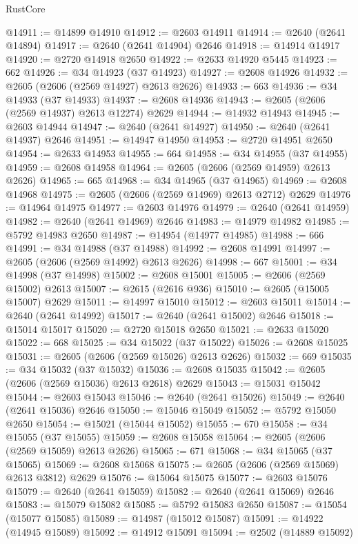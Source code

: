 \begin{lexlean}{RustCore}
\begin{coremodule}
@14911 := @14899 @14910
@14912 := @2603 @14911
@14914 := @2640 (@2641 @14894)
@14917 := @2640 (@2641 @14904) @2646
@14918 := @14914 @14917
@14920 := @2720 @14918 @2650
@14922 := @2633 @14920 @5445
@14923 := 662
@14926 := @34 @14923 (@37 @14923)
@14927 := @2608 @14926
@14932 := @2605 (@2606 (@2569 @14927) @2613 @2626)
@14933 := 663
@14936 := @34 @14933 (@37 @14933)
@14937 := @2608 @14936
@14943 := @2605 (@2606 (@2569 @14937) @2613 @12274) @2629
@14944 := @14932 @14943
@14945 := @2603 @14944
@14947 := @2640 (@2641 @14927)
@14950 := @2640 (@2641 @14937) @2646
@14951 := @14947 @14950
@14953 := @2720 @14951 @2650
@14954 := @2633 @14953
@14955 := 664
@14958 := @34 @14955 (@37 @14955)
@14959 := @2608 @14958
@14964 := @2605 (@2606 (@2569 @14959) @2613 @2626)
@14965 := 665
@14968 := @34 @14965 (@37 @14965)
@14969 := @2608 @14968
@14975 := @2605 (@2606 (@2569 @14969) @2613 @2712) @2629
@14976 := @14964 @14975
@14977 := @2603 @14976
@14979 := @2640 (@2641 @14959)
@14982 := @2640 (@2641 @14969) @2646
@14983 := @14979 @14982
@14985 := @5792 @14983 @2650
@14987 := @14954 (@14977 @14985)
@14988 := 666
@14991 := @34 @14988 (@37 @14988)
@14992 := @2608 @14991
@14997 := @2605 (@2606 (@2569 @14992) @2613 @2626)
@14998 := 667
@15001 := @34 @14998 (@37 @14998)
@15002 := @2608 @15001
@15005 := @2606 (@2569 @15002) @2613
@15007 := @2615 (@2616 @936)
@15010 := @2605 (@15005 @15007) @2629
@15011 := @14997 @15010
@15012 := @2603 @15011
@15014 := @2640 (@2641 @14992)
@15017 := @2640 (@2641 @15002) @2646
@15018 := @15014 @15017
@15020 := @2720 @15018 @2650
@15021 := @2633 @15020
@15022 := 668
@15025 := @34 @15022 (@37 @15022)
@15026 := @2608 @15025
@15031 := @2605 (@2606 (@2569 @15026) @2613 @2626)
@15032 := 669
@15035 := @34 @15032 (@37 @15032)
@15036 := @2608 @15035
@15042 := @2605 (@2606 (@2569 @15036) @2613 @2618) @2629
@15043 := @15031 @15042
@15044 := @2603 @15043
@15046 := @2640 (@2641 @15026)
@15049 := @2640 (@2641 @15036) @2646
@15050 := @15046 @15049
@15052 := @5792 @15050 @2650
@15054 := @15021 (@15044 @15052)
@15055 := 670
@15058 := @34 @15055 (@37 @15055)
@15059 := @2608 @15058
@15064 := @2605 (@2606 (@2569 @15059) @2613 @2626)
@15065 := 671
@15068 := @34 @15065 (@37 @15065)
@15069 := @2608 @15068
@15075 := @2605 (@2606 (@2569 @15069) @2613 @3812) @2629
@15076 := @15064 @15075
@15077 := @2603 @15076
@15079 := @2640 (@2641 @15059)
@15082 := @2640 (@2641 @15069) @2646
@15083 := @15079 @15082
@15085 := @5792 @15083 @2650
@15087 := @15054 (@15077 @15085)
@15089 := @14987 (@15012 @15087)
@15091 := @14922 (@14945 @15089)
@15092 := @14912 @15091
@15094 := @2502 (@14889 @15092)

\end{coremodule}
\end{lexlean}
